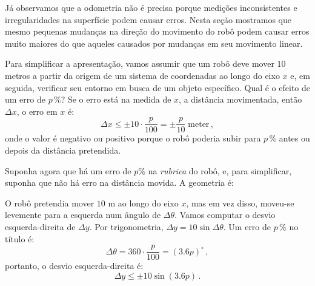 {Já observamos que a odometria não é precisa porque medições inconsistentes e irregularidades na superfície podem causar erros. Nesta seção mostramos que mesmo pequenas mudanças na direção do movimento do robô podem causar erros muito maiores do que aqueles causados por mudanças em seu movimento linear.

Para simplificar a apresentação, vamos assumir que um robô deve mover $10$ metros a partir da origem de um sistema de coordenadas ao longo do eixo $x$ e, em seguida, verificar seu entorno em busca de um objeto específico. Qual é o efeito de um erro de $p\,\%$? Se o erro está na medida de $x$, a distância movimentada, então $\Delta x$, o erro em $x$ é:
\[\Delta x \leq \pm 10\cdot\frac{p}{100} = \pm\frac{p}{10}\; \textrm{meter}\,,\]
onde o valor é negativo ou positivo porque o robô poderia subir para $p\,\%$ antes ou depois da distância pretendida.

Suponha agora que há um erro de $p\%$ na \emph{rubrica} do robô, e, para simplificar, suponha que não há erro na distância movida. A geometria é:
\begin{center}
\end{center}
O robô pretendia mover $10$ m ao longo do eixo $x$, mas em vez disso, moveu-se levemente para a esquerda num ângulo de $\Delta\theta$. Vamos computar o desvio esquerda-direita de $\Delta y$. Por trigonometria, $\Delta y = 10\sin \Delta\theta$. Um erro de $p\,\%$ no título é:
\[
\Delta\theta=360\cdot\frac{p}{100}=(3.6p)^\circ\,,
\]
portanto, o desvio esquerda-direita é:
\[
\Delta y \leq \pm 10 \sin (3.6p)\,.
\]

}
